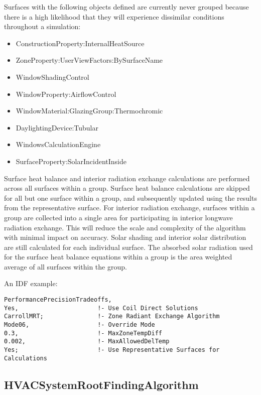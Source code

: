 Surfaces with the following objects defined are currently never grouped because there is a high likelihood that they will experience dissimilar conditions throughout a simulation:

\begin{itemize}
    \item ConstructionProperty:InternalHeatSource
    \item ZoneProperty:UserViewFactors:BySurfaceName
    \item WindowShadingControl
    \item WindowProperty:AirflowControl
    \item WindowMaterial:GlazingGroup:Thermochromic
    \item DaylightingDevice:Tubular
    \item WindowsCalculationEngine
    \item SurfaceProperty:SolarIncidentInside
\end{itemize}

Surface heat balance and interior radiation exchange calculations are performed across all surfaces within a group. Surface heat balance calculations are skipped for all but one surface within a group, and subsequently updated using the results from the representative surface. For interior radiation exchange, surfaces within a group are collected into a single area for participating in interior longwave radiation exchange. This will reduce the scale and complexity of the algorithm with minimal impact on accuracy. Solar shading and interior solar distribution are still calculated for each individual surface. The absorbed solar radiation used for the surface heat balance equations within a group is the area weighted average of all surfaces within the group.

An IDF example:

\begin{lstlisting}
PerformancePrecisionTradeoffs,
Yes,                      !- Use Coil Direct Solutions
CarrollMRT;               !- Zone Radiant Exchange Algorithm
Mode06,                   !- Override Mode
0.3,                      !- MaxZoneTempDiff
0.002,                    !- MaxAllowedDelTemp
Yes;                      !- Use Representative Surfaces for Calculations
\end{lstlisting}

\subsection{HVACSystemRootFindingAlgorithm}\label{hvacystemrootfindingalgorithm}

